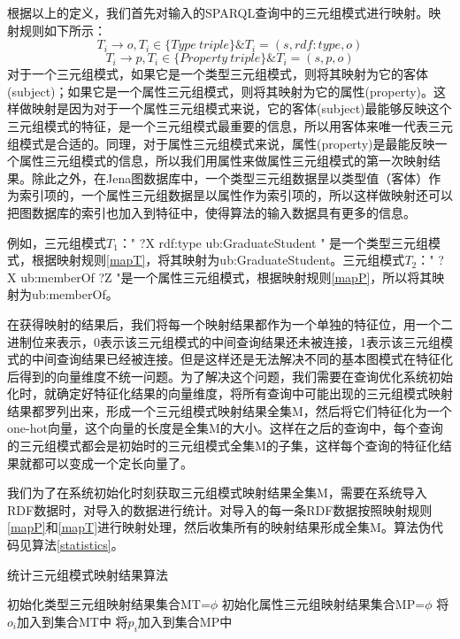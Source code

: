 根据以上的定义，我们首先对输入的SPARQL查询中的三元组模式进行映射。映射规则如下所示：
\begin{equation}
    \label{mapT}
    T_i \rightarrow o, T_i \in \lbrace Type\ triple\rbrace \& T_i = (s,rdf:type,o)   
\end{equation}
\begin{equation}
    \label{mapP}
    T_i \rightarrow p, T_i \in \lbrace Property\ triple\rbrace \& T_i = (s,p,o)   
\end{equation}
对于一个三元组模式，如果它是一个类型三元组模式，则将其映射为它的客体(subject)；如果它是一个属性三元组模式，则将其映射为它的属性(property)。这样做映射是因为对于一个属性三元组模式来说，它的客体(subject)最能够反映这个三元组模式的特征，是一个三元组模式最重要的信息，所以用客体来唯一代表三元组模式是合适的。同理，对于属性三元组模式来说，属性(property)是最能反映一个属性三元组模式的信息，所以我们用属性来做属性三元组模式的第一次映射结果。除此之外，在Jena图数据库中，一个类型三元组数据昰以类型值（客体）作为索引项的，一个属性三元组数据昰以属性作为索引项的，所以这样做映射还可以把图数据库的索引也加入到特征中，使得算法的输入数据具有更多的信息。

例如，三元组模式$T_1$：" ?X rdf:type ub:GraduateStudent " 是一个类型三元组模式，根据映射规则\ref{mapT}，将其映射为ub:GraduateStudent。三元组模式$T_2$：" ?X ub:memberOf ?Z "是一个属性三元组模式，根据映射规则\ref{mapP}，所以将其映射为ub:memberOf。

在获得映射的结果后，我们将每一个映射结果都作为一个单独的特征位，用一个二进制位来表示，0表示该三元组模式的中间查询结果还未被连接，1表示该三元组模式的中间查询结果已经被连接。但是这样还是无法解决不同的基本图模式在特征化后得到的向量维度不统一问题。为了解决这个问题，我们需要在查询优化系统初始化时，就确定好特征化结果的向量维度，将所有查询中可能出现的三元组模式映射结果都罗列出来，形成一个三元组模式映射结果全集M，然后将它们特征化为一个one-hot向量，这个向量的长度是全集M的大小。这样在之后的查询中，每个查询的三元组模式都会是初始时的三元组模式全集M的子集，这样每个查询的特征化结果就都可以变成一个定长向量了。

我们为了在系统初始化时刻获取三元组模式映射结果全集M，需要在系统导入RDF数据时，对导入的数据进行统计。对导入的每一条RDF数据按照映射规则\ref{mapP}和\ref{mapT}进行映射处理，然后收集所有的映射结果形成全集M。算法伪代码见算法\ref{statistics}。
\begin{algorithm}[ht]
    \caption{统计三元组模式映射结果算法}
    \label{statistics}    
    初始化类型三元组映射结果集合MT=$\phi $\;
    初始化属性三元组映射结果集合MP=$\phi $\;
    {
        {
            将$o_i$加入到集合MT中\;
        }
        {
            将$p_i$加入到集合MP中\;
        }
    }
\end{algorithm} 

